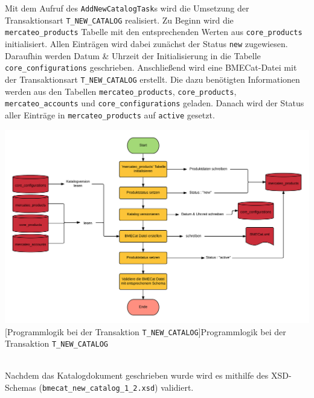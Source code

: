 	Mit dem Aufruf des \texttt{AddNewCatalogTask}s wird die Umsetzung der Transaktionsart \texttt{T\_NEW\_CATALOG} realisiert. Zu Beginn wird die \texttt{mercateo\_products} Tabelle mit den entsprechenden Werten aus \texttt{core\_products} initialisiert. Allen Einträgen wird dabei zunächst der Status \texttt{new} zugewiesen. Daraufhin werden Datum \& Uhrzeit der Initialisierung in die Tabelle \texttt{core\_configurations} geschrieben. Anschließend wird eine BMECat-Datei mit der Transaktionsart \texttt{T\_NEW\_CATALOG} erstellt. Die dazu benötigten Informationen werden aus den Tabellen \texttt{mercateo\_products}, \texttt{core\_products}, \texttt{mercateo\_accounts} und \texttt{core\_configurations} geladen. Danach wird der Status aller Einträge in \texttt{mercateo\_products} auf \texttt{active} gesetzt. 
	
	\begin{minipage}{\linewidth}
		\vspace{1em}
		\centering
		\includegraphics[width=1 \linewidth]{img/newCatalogComplete}
		[Programmlogik  bei der Transaktion \texttt{T\_NEW\_CATALOG}]{Programmlogik  bei der Transaktion \texttt{T\_NEW\_CATALOG}}
		\vspace{1em}
	\end{minipage}\\
	
	Nachdem das Katalogdokument geschrieben wurde wird es mithilfe des  XSD-Schemas (\texttt{bmecat\_new\_catalog\_1\_2.xsd}) validiert. 

